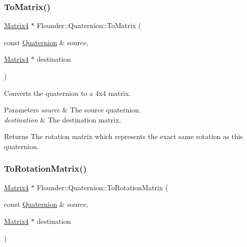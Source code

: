 \subsubsection{\texorpdfstring{To\+Matrix()}{ToMatrix()}}
{\footnotesize\ttfamily \hyperlink{class_flounder_1_1_matrix4}{Matrix4} $\ast$ Flounder\+::\+Quaternion\+::\+To\+Matrix (\begin{DoxyParamCaption}\item[{const \hyperlink{class_flounder_1_1_quaternion}{Quaternion} \&}]{source,  }\item[{\hyperlink{class_flounder_1_1_matrix4}{Matrix4} $\ast$}]{destination }\end{DoxyParamCaption})\hspace{0.3cm}{\ttfamily [static]}}



Converts the quaternion to a 4x4 matrix. 


\begin{DoxyParams}{Parameters}
{\em source} & The source quaternion. \\
\hline
{\em destination} & The destination matrix.\\
\hline
\end{DoxyParams}
\begin{DoxyReturn}{Returns}
The rotation matrix which represents the exact same rotation as this quaternion. 
\end{DoxyReturn}
\mbox{\label{class_flounder_1_1_quaternion_a5fd9b9cb5501a1478ed7f640faae3b92}} 
\subsubsection{\texorpdfstring{To\+Rotation\+Matrix()}{ToRotationMatrix()}}
{\footnotesize\ttfamily \hyperlink{class_flounder_1_1_matrix4}{Matrix4} $\ast$ Flounder\+::\+Quaternion\+::\+To\+Rotation\+Matrix (\begin{DoxyParamCaption}\item[{const \hyperlink{class_flounder_1_1_quaternion}{Quaternion} \&}]{source,  }\item[{\hyperlink{class_flounder_1_1_matrix4}{Matrix4} $\ast$}]{destination }\end{DoxyParamCaption})\hspace{0.3cm}{\ttfamily [static]}}




